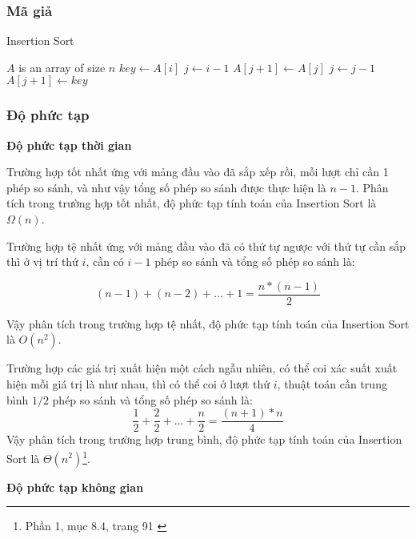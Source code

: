 \subsubsection{Mã giả}
 
\begin{algorithm}
\caption{Insertion Sort}
\label{alg:insertion-sort}
\begin{algorithmic}

\Require $A$ is an array of size $n$
    \State $key \gets A[i]$ 
    \State $j \gets i - 1$
        \State $A[j+1] \gets A[j]$ 
        \State $j \gets j - 1$
    \EndWhile
    \State $A[j+1] \gets key$ 
\EndFor
\EndFunction

\end{algorithmic}
\end{algorithm}

\subsubsection{Độ phức tạp}
\textbf{Độ phức tạp thời gian}

Trường hợp tốt nhất ứng với mảng đầu vào đã sắp xếp rồi, mỗi lượt chỉ cần 1 phép so sánh, và như vậy tổng số phép so sánh được thực hiện là $n - 1$. Phân tích trong trường hợp tốt nhất, độ phức tạp tính toán của Insertion Sort là $\Omega(n)$.

Trường hợp tệ nhất ứng với mảng đầu vào đã có thứ tự ngược với thứ tự cần sắp thì ở vị trí thứ $i$, cần có $i - 1$ phép so sánh và tổng số phép so sánh là: 

$$(n-1) + (n-2) + ... + 1 = \frac{n* (n-1)}{2}$$ 

Vậy phân tích trong trường hợp tệ nhất, độ phức tạp tính toán của Insertion Sort là $O(n^2)$.

Trường hợp các giá trị xuất hiện một cách ngẫu nhiên, có thể coi xác suất xuất hiện mỗi giá trị là như nhau, thì có thể coi ở lượt thứ $i$, thuật toán cần trung bình $1 / 2$ phép so sánh và tổng số phép so sánh là: $$\frac{1}{2} + \frac{2}{2} + ... + \frac{n}{2} = \frac{(n + 1) * n}{4}$$
Vậy phân tích trong trường hợp trung bình, độ phức tạp tính toán của Insertion Sort là $\Theta(n^2)$\footnote{Phần 1, mục 8.4, trang 91 \cite{hoang1999giaithuat}}.

\textbf{Độ phức tạp không gian}

